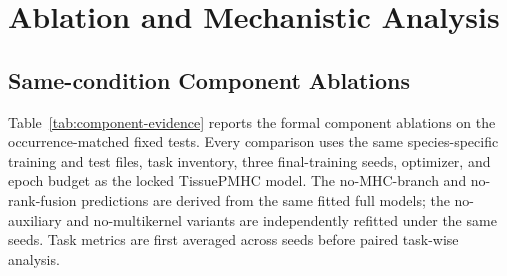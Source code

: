 \section{Ablation and Mechanistic Analysis}

\subsection{Same-condition Component Ablations}

Table~\ref{tab:component-evidence} reports the formal component ablations on the occurrence-matched fixed tests. Every comparison uses the same species-specific training and test files, task inventory, three final-training seeds, optimizer, and epoch budget as the locked TissuePMHC model. The no-MHC-branch and no-rank-fusion predictions are derived from the same fitted full models; the no-auxiliary and no-multikernel variants are independently refitted under the same seeds. Task metrics are first averaged across seeds before paired task-wise analysis.


